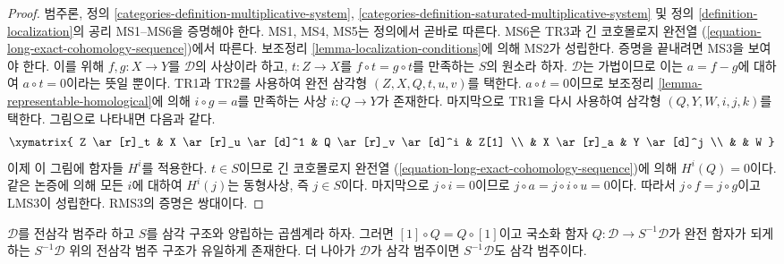 \begin{proof}
범주론, 정의 \ref{categories-definition-multiplicative-system},
\ref{categories-definition-saturated-multiplicative-system} 및
정의 \ref{definition-localization}의 공리 MS1--MS6을 증명해야 한다.
MS1, MS4, MS5는 정의에서 곧바로 따른다. MS6은 TR3과 긴 코호몰로지
완전열 (\ref{equation-long-exact-cohomology-sequence})에서 따른다.
보조정리 \ref{lemma-localization-conditions}에 의해 MS2가 성립한다.
증명을 끝내려면 MS3을 보여야 한다. 이를 위해 $f, g : X \to Y$를
$\mathcal{D}$의 사상이라 하고, $t : Z \to X$를
$f \circ t = g \circ t$를 만족하는 $S$의 원소라 하자.
$\mathcal{D}$는 가법이므로 이는 $a = f - g$에 대하여
$a \circ t = 0$이라는 뜻일 뿐이다. TR1과 TR2를 사용하여 완전 삼각형
$(Z, X, Q, t, u, v)$를 택한다. $a \circ t = 0$이므로 보조정리
\ref{lemma-representable-homological}에 의해
$i \circ g = a$를 만족하는 사상 $i : Q \to Y$가 존재한다.
마지막으로 TR1을 다시 사용하여 삼각형 $(Q, Y, W, i, j, k)$를 택한다.
그림으로 나타내면 다음과 같다.
$$
\xymatrix{
Z \ar[r]_t & X \ar[r]_u \ar[d]^1 & Q \ar[r]_v \ar[d]^i & Z[1] \\
& X \ar[r]_a & Y \ar[d]^j \\
& & W
}
$$
이제 이 그림에 함자들 $H^i$를 적용한다. $t \in S$이므로 긴 코호몰로지
완전열 (\ref{equation-long-exact-cohomology-sequence})에 의해
$H^i(Q) = 0$이다. 같은 논증에 의해 모든 $i$에 대하여 $H^i(j)$는
동형사상, 즉 $j \in S$이다. 마지막으로 $j \circ i = 0$이므로
$j \circ a = j \circ i \circ u = 0$이다. 따라서
$j \circ f = j \circ g$이고 LMS3이 성립한다. RMS3의 증명은 쌍대이다.
\end{proof}

\begin{proposition}
\label{proposition-construct-localization}
$\mathcal{D}$를 전삼각 범주라 하고 $S$를 삼각 구조와 양립하는
곱셈계라 하자. 그러면 $[1] \circ Q = Q \circ [1]$이고 국소화 함자
$Q : \mathcal{D} \to S^{-1}\mathcal{D}$가 완전 함자가 되게 하는
$S^{-1}\mathcal{D}$ 위의 전삼각 범주 구조가 유일하게 존재한다.
더 나아가 $\mathcal{D}$가 삼각 범주이면 $S^{-1}\mathcal{D}$도
삼각 범주이다.
\end{proposition}

